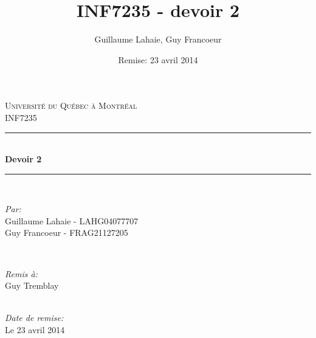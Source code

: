\documentclass[12pt,letterpaper]{article} %
\title{INF7235 - devoir 2}
\author{Guillaume Lahaie, Guy Francoeur}
\date{Remise: 23 avril 2014}
\newcommand\blankpage{%
  \null
  \thispagestyle{empty}%
  \addtocounter{page}{-1}%
  \newpage}
\begin{document}
\fussy


\begin{titlepage}

\newcommand{\HRule}{\rule{\linewidth}{0.5mm}} %

\center %

\textsc{\LARGE Université du Québec à Montréal}\\[1.5cm] %
\textsc{\Large INF7235}\\[0.5cm] %

\HRule \\[1.5cm]
{ \huge \bfseries Devoir 2}\\[0.4cm] %
\HRule \\[1.5cm]

\begin{minipage}{0.4\textwidth}
\begin{flushleft} \large
\emph{Par:}\\
Guillaume Lahaie - LAHG04077707\\
Guy Francoeur -  FRAG21127205
\end{flushleft}
\end{minipage}
~
\begin{minipage}{0.4\textwidth}
\begin{flushright} \large
\emph{Remis à:} \\
Guy Tremblay%
\end{flushright}
\end{minipage}\\[4cm]

{\large \emph{Date de remise:} \\ Le 23 avril 2014}\\[3cm] %


\vfill %

\end{titlepage}
\blankpage
\end{document}
